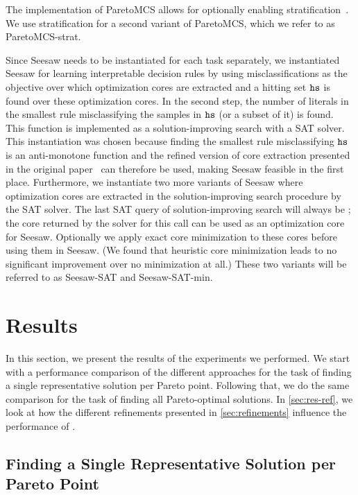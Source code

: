The implementation of ParetoMCS allows for optionally enabling stratification~\autocite{DBLP:conf/ijcai/Terra-NevesLM18}.
We use stratification for a second variant of ParetoMCS, which we refer to as ParetoMCS-strat.

Since Seesaw needs to be instantiated for each task separately, we instantiated Seesaw for learning interpretable decision rules by using misclassifications as the objective over which optimization cores are extracted and a hitting set $\texttt{hs}$ is found over these optimization cores.
In the second step, the number of literals in the smallest rule misclassifying the samples in $\texttt{hs}$ (or a subset of it) is found.
This function is implemented as a solution-improving search with a SAT solver.
This instantiation was chosen because finding the smallest rule misclassifying $\texttt{hs}$ is an anti-monotone function and the refined version of core extraction presented in the original paper~\autocite{DBLP:conf/cp/JanotaMSM21} can therefore be used, making Seesaw feasible in the first place.
Furthermore, we instantiate two more variants of Seesaw where optimization cores are extracted in the solution-improving search procedure by the SAT solver.
The last SAT query of solution-improving search will always be \unsat{};
the core returned by the solver for this call can be used as an optimization core for Seesaw.
Optionally we apply exact core minimization to these cores before using them in Seesaw.
(We found that heuristic core minimization leads to no significant improvement over no minimization at all.)
These two variants will be referred to as Seesaw-SAT and Seesaw-SAT-min.

\section{Results\label{sec:results}}

In this section, we present the results of the experiments we performed.
We start with a performance comparison of the different approaches for the task of finding a single representative solution per Pareto point.
Following that, we do the same comparison for the task of finding all Pareto-optimal solutions.
In \cref{sec:res-ref}, we look at how the different refinements presented in \cref{sec:refinements} influence the performance of \algname{}.

\subsection{Finding a Single Representative Solution per Pareto Point}

